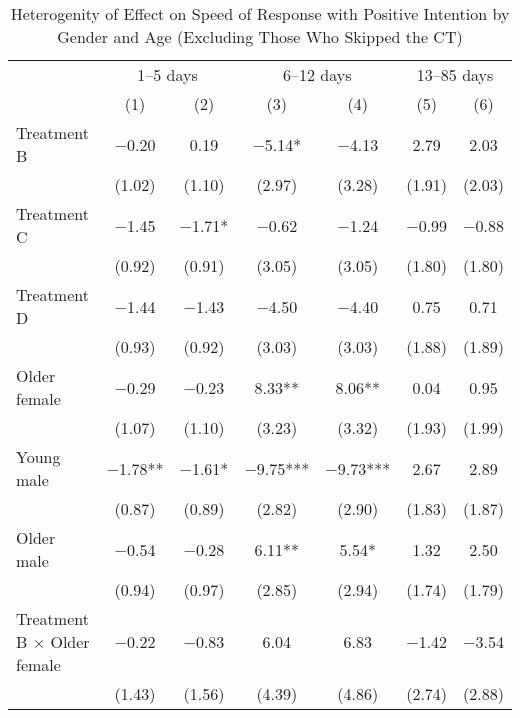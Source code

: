 \documentclass[12pt, a4paper]{article}
\begin{document}
\begin{table}[H]

\caption{\label{tab:lm-interaction-gender-age-int-time-decompose-noskip}Heterogenity of Effect on Speed of Response with Positive Intention by Gender and Age (Excluding Those Who Skipped the CT)}
\centering
\fontsize{8}{10}\selectfont
\begin{threeparttable}
\begin{tabular}[t]{lcccccc}
\toprule
\multicolumn{1}{c}{ } & \multicolumn{2}{c}{1--5 days} & \multicolumn{2}{c}{6--12 days} & \multicolumn{2}{c}{13--85 days} \\
\cmidrule(l{3pt}r{3pt}){2-3} \cmidrule(l{3pt}r{3pt}){4-5} \cmidrule(l{3pt}r{3pt}){6-7}
  & (1) & (2) & (3) & (4) & (5) & (6)\\
\midrule
Treatment B & \num{-0.20} & \num{0.19} & \num{-5.14}* & \num{-4.13} & \num{2.79} & \num{2.03}\\
 & (\num{1.02}) & (\num{1.10}) & (\num{2.97}) & (\num{3.28}) & (\num{1.91}) & (\num{2.03})\\
Treatment C & \num{-1.45} & \num{-1.71}* & \num{-0.62} & \num{-1.24} & \num{-0.99} & \num{-0.88}\\
 & (\num{0.92}) & (\num{0.91}) & (\num{3.05}) & (\num{3.05}) & (\num{1.80}) & (\num{1.80})\\
Treatment D & \num{-1.44} & \num{-1.43} & \num{-4.50} & \num{-4.40} & \num{0.75} & \num{0.71}\\
 & (\num{0.93}) & (\num{0.92}) & (\num{3.03}) & (\num{3.03}) & (\num{1.88}) & (\num{1.89})\\
Older female & \num{-0.29} & \num{-0.23} & \num{8.33}** & \num{8.06}** & \num{0.04} & \num{0.95}\\
 & (\num{1.07}) & (\num{1.10}) & (\num{3.23}) & (\num{3.32}) & (\num{1.93}) & (\num{1.99})\\
Young male & \num{-1.78}** & \num{-1.61}* & \num{-9.75}*** & \num{-9.73}*** & \num{2.67} & \num{2.89}\\
 & (\num{0.87}) & (\num{0.89}) & (\num{2.82}) & (\num{2.90}) & (\num{1.83}) & (\num{1.87})\\
Older male & \num{-0.54} & \num{-0.28} & \num{6.11}** & \num{5.54}* & \num{1.32} & \num{2.50}\\
 & (\num{0.94}) & (\num{0.97}) & (\num{2.85}) & (\num{2.94}) & (\num{1.74}) & (\num{1.79})\\
Treatment B $\times$ Older female & \num{-0.22} & \num{-0.83} & \num{6.04} & \num{6.83} & \num{-1.42} & \num{-3.54}\\
 & (\num{1.43}) & (\num{1.56}) & (\num{4.39}) & (\num{4.86}) & (\num{2.74}) & (\num{2.88})\\

\end{tabular}
\end{threeparttable}
\end{table}
\end{document}
